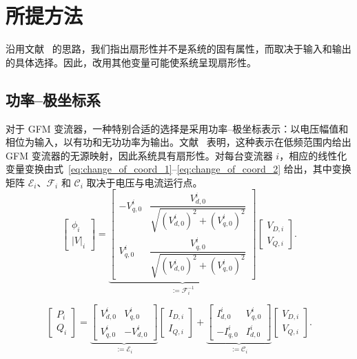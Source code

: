 \section{所提方法}
\label{sec:propo_approch}

沿用文献~\cite{deyPassivityBasedDecentralizedCriteria2023,chenExtendedFrequencyDomainPassivity2025a} 的思路，我们指出扇形性并不是系统的固有属性，而取决于输入和输出的具体选择。因此，改用其他变量可能使系统呈现扇形性。

\subsection{功率--极坐标系}
对于 GFM 变流器，一种特别合适的选择是采用功率--极坐标表示：以电压幅值和相位为输入，以有功和无功功率为输出。文献~\cite{deyAnalysisPassivityCharacteristics2021} 表明，这种表示在低频范围内给出 GFM 变流器的无源映射，因此系统具有扇形性。对每台变流器 $i$，相应的线性化变量变换由式~\eqref{eq:change_of_coord_1}--\eqref{eq:change_of_coord_2} 给出，其中变换矩阵 $\mathcal{E}_i$、$\mathcal{F}_i$ 和 $\mathcal{C}_i$ 取决于电压与电流运行点。
\begin{equation}
\begin{bmatrix}
\phi_i\\ |V|_i
\end{bmatrix}
=
\underbrace{
\begin{bmatrix}
-V^i_{q,0} & \dfrac{V^i_{d,0}}{\sqrt{(V^i_{d,0})^2+(V^i_{q,0})^2}}\\
V^i_{q,0} & \dfrac{V^i_{q,0}}{\sqrt{(V^i_{d,0})^2+(V^i_{q,0})^2}}
\end{bmatrix}}_{:=\mathcal{F}_i^{-1}}
\begin{bmatrix}V_{D,i}\\V_{Q,i}\end{bmatrix}.
\label{eq:change_of_coord_1}
\end{equation}

\begin{equation}
\begin{bmatrix}P_i\\Q_i\end{bmatrix}
=\underbrace{\begin{bmatrix}
V^i_{d,0}&V^i_{q,0}\\
V^i_{q,0}&-V^i_{d,0}
\end{bmatrix}}_{:=\mathcal{E}_i}
\begin{bmatrix}I_{D,i}\\I_{Q,i}\end{bmatrix}
+\underbrace{\begin{bmatrix}
I^i_{d,0}&V^i_{q,0}\\
-I^i_{q,0}&I^i_{d,0}
\end{bmatrix}}_{:=\mathcal{C}_i}
\begin{bmatrix}V_{D,i}\\V_{Q,i}\end{bmatrix}.
\label{eq:change_of_coord_2}
\end{equation}

